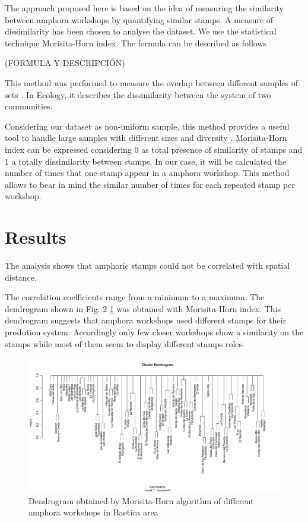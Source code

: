 \documentclass[review]{elsarticle}
\begin{document}

The approach proposed here is based on the idea of measuring the similarity between amphora workshops by quantifying similar stamps. A measure of dissimilarity has been chosen to analyse the dataset. We use the statistical technique Morisita-Horn index. The formula can be described as follows

(FORMULA Y DESCRIPCIÓN)


This method was performed to measure the overlap between different samples of sets \citep{morisita_measuring_1959, horn_measurement_1966}. In Ecology, it describes the dissimilarity between the system of two communities. 

Considering our dataset as non-uniform sample, this method provides a useful tool to handle large samples with different sizes and diversity \citep{wolda_similarity_1981}. Morisita-Horn index can be expressed considering 0 as total presence of similarity of stamps and 1 a totally dissimilarity between stamps. In our case, it will be calculated the number of times that one stamp appear in a amphora workshop. This method allows to bear in mind the similar number of times for each repeated stamp per workshop. 


\section{Results}

The analysis shows that amphoric stamps could not be correlated with spatial distance. 

The correlation coefficients range from a minimum to a maximum. The dendrogram shown in Fig. 2 \ref{dendro} was obtained with Morisita-Horn index. This dendrogram suggests that amphora workshops used different stamps for their prodution system. Accordingly only few closer workshops show a similarity on the stamps while most of them seem to display different stamps roles. 

\begin{figure}[htp]
	\centering
\includegraphics[width=\linewidth]{figs/dendro}
\caption{Dendrogram obtained by Morisita-Horn algorithm of different amphora workshops in Baetica area}
\label{dendro}
\end{figure} 
\end{document}
